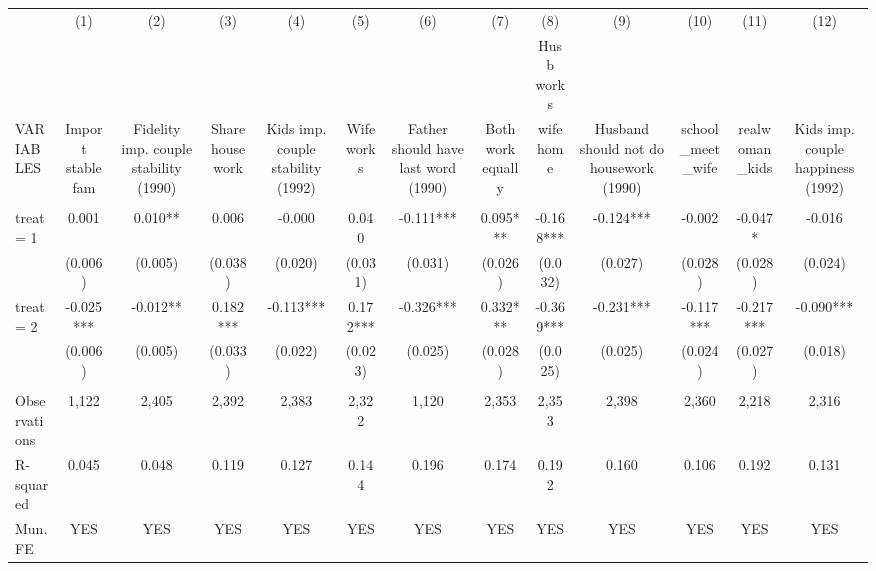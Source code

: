 \begin{tabular}{lcccccccccccc} \hline
 & (1) & (2) & (3) & (4) & (5) & (6) & (7) & (8) & (9) & (10) & (11) & (12) \\
 &  &  &  &  &  &  &  & Husb works &  &  &  &  \\
VARIABLES & Import stable fam & Fidelity imp. couple stability (1990) & Share housework & Kids imp. couple stability (1992) & Wife works & Father should have last word (1990) & Both work equally & wife home & Husband should not do housework (1990) & school\_meet\_wife & realwoman\_kids & Kids imp. couple happiness (1992) \\ \hline
 &  &  &  &  &  &  &  &  &  &  &  &  \\
treat = 1 & 0.001 & 0.010** & 0.006 & -0.000 & 0.040 & -0.111*** & 0.095*** & -0.168*** & -0.124*** & -0.002 & -0.047* & -0.016 \\
 & (0.006) & (0.005) & (0.038) & (0.020) & (0.031) & (0.031) & (0.026) & (0.032) & (0.027) & (0.028) & (0.028) & (0.024) \\
treat = 2 & -0.025*** & -0.012** & 0.182*** & -0.113*** & 0.172*** & -0.326*** & 0.332*** & -0.369*** & -0.231*** & -0.117*** & -0.217*** & -0.090*** \\
 & (0.006) & (0.005) & (0.033) & (0.022) & (0.023) & (0.025) & (0.028) & (0.025) & (0.025) & (0.024) & (0.027) & (0.018) \\
 &  &  &  &  &  &  &  &  &  &  &  &  \\
Observations & 1,122 & 2,405 & 2,392 & 2,383 & 2,322 & 1,120 & 2,353 & 2,353 & 2,398 & 2,360 & 2,218 & 2,316 \\
R-squared & 0.045 & 0.048 & 0.119 & 0.127 & 0.144 & 0.196 & 0.174 & 0.192 & 0.160 & 0.106 & 0.192 & 0.131 \\
 Mun. FE & YES & YES & YES & YES & YES & YES & YES & YES & YES & YES & YES & YES \\ \hline
\end{tabular}
